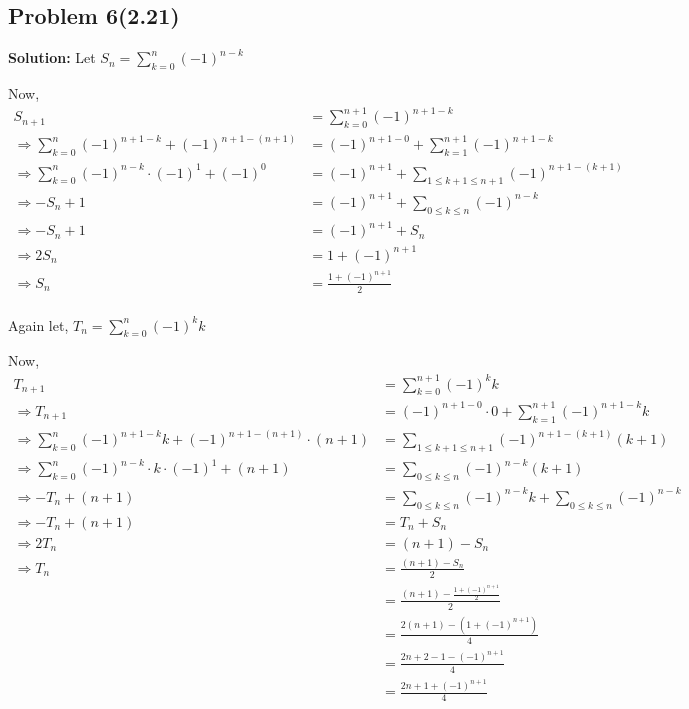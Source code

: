\subsection{Problem 6(2.21)}
\begin{flushleft}
    \textbf{Solution: }
    Let $ S_n = \sum_{k=0}^{n} (-1)^{n-k} $
    \par
    Now,
    $$
        \begin{aligned}
            S_{n+1}   & = \sum_{k=0}^{n+1} (-1)^{n+1-k}  \\
            \Rightarrow \sum_{k=0}^{n} (-1)^{n+1-k} + (-1)^{n+1-(n+1)}   & = (-1)^{n+1-0} + \sum_{k=1}^{n+1} (-1)^{n+1-k}                \\
            \Rightarrow \sum_{k=0}^{n} (-1)^{n-k} \cdot (-1)^1 + (-1)^0   & = (-1)^{n+1} + \sum_{1 \leq k+1 \leq n+1}^{} (-1)^{n+1-(k+1)} \\
            \Rightarrow -S_n + 1 & = (-1)^{n+1} + \sum_{0 \leq k \leq n} (-1)^{n-k}              \\
            \Rightarrow  -S_n + 1 & = (-1)^{n+1} + S_n              \\
            \Rightarrow 2S_n & = 1 + (-1)^{n+1} \\
            \Rightarrow S_n & = \frac{1 + (-1)^{n+1}}{2} \\
        \end{aligned}
    $$

    \par

    Again let, $ T_n = \sum_{k=0}^{n} (-1)^k k $
    \par
    Now,
    $$
    \begin{aligned}
        T_{n+1} &= \sum_{k=0}^{n+1} (-1)^k k \\
        \Rightarrow T_{n+1} &= (-1)^{n+1-0} \cdot 0 + \sum_{k=1}^{n+1} (-1)^{n+1-k} k \\
        \Rightarrow \sum_{k=0}^{n} (-1)^{n+1-k}k + (-1)^{n+1-(n+1)} \cdot (n+1) &= \sum_{1 \leq k+1 \leq n+1} (-1)^{n+1-(k+1)}(k+1)\\
        \Rightarrow \sum_{k=0}^{n} (-1)^{n-k} \cdot k \cdot (-1)^1 + (n+1) &= \sum_{0 \leq k \leq n} (-1)^{n-k}(k+1)\\
        \Rightarrow -T_n + (n+1) &= \sum_{0 \leq k \leq n} (-1)^{n-k}k + \sum_{0 \leq k \leq n} (-1)^{n-k} \\
        \Rightarrow -T_n + (n+1) &= T_n + S_n \\
        \Rightarrow 2T_n &= (n+1) - S_n \\
        \Rightarrow T_n &= \frac{(n+1) - S_n}{2} \\
                        &= \frac{(n+1) - \frac{1 + (-1)^{n+1}}{2}}{2} \\
                        &= \frac{2(n+1) - (1 + (-1)^{n+1})}{4} \\
                        &= \frac{2n + 2 - 1 - (-1)^{n+1}}{4} \\
                        &= \frac{2n + 1 + (-1)^{n+1}}{4} \\
    \end{aligned}
    $$

\end{flushleft}